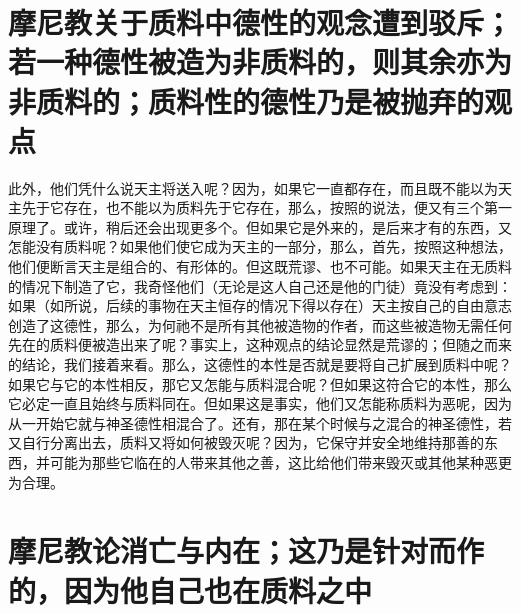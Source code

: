 
\section{摩尼教关于质料中德性的观念遭到驳斥；若一种德性被造为非质料的，则其余亦为非质料的；质料性的德性乃是被抛弃的观点}

此外，他们凭什么说天主将送入呢？因为，如果它一直都存在，而且既不能以为天主先于它存在，也不能以为质料先于它存在，那么，按照的说法，便又有三个第一原理了。或许，稍后还会出现更多个。但如果它是外来的，是后来才有的东西，又怎能没有质料呢？如果他们使它成为天主的一部分，那么，首先，按照这种想法，他们便断言天主是组合的、有形体的。但这既荒谬、也不可能。如果天主在无质料的情况下制造了它，我奇怪他们（无论是这人自己还是他的门徒）竟没有考虑到：如果（如所说，后续的事物在天主恒存的情况下得以存在）天主按自己的自由意志创造了这德性，那么，为何祂不是所有其他被造物的作者，而这些被造物无需任何先在的质料便被造出来了呢？事实上，这种观点的结论显然是荒谬的；但随之而来的结论，我们接着来看。那么，这德性的本性是否就是要将自己扩展到质料中呢？如果它与它的本性相反，那它又怎能与质料混合呢？但如果这符合它的本性，那么它必定一直且始终与质料同在。但如果这是事实，他们又怎能称质料为恶呢，因为从一开始它就与神圣德性相混合了。还有，那在某个时候与之混合的神圣德性，若又自行分离出去，质料又将如何被毁灭呢？因为，它保守并安全地维持那善的东西，并可能为那些它临在的人带来其他之善，这比给他们带来毁灭或其他某种恶更为合理。\par


\section{摩尼教论消亡与内在；这乃是针对而作的，因为他自己也在质料之中}

